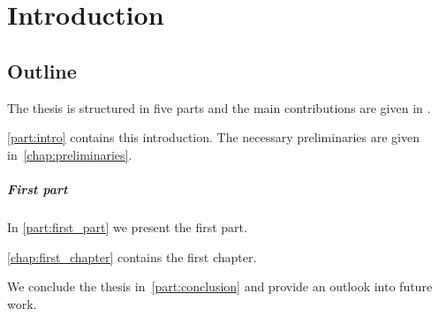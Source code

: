 \chapter{Introduction}
\label{chap:introduction}


\section{Outline}
\label{sec:intro:outline}



The thesis is structured in five parts and the main contributions are given in .


\cref{part:intro} contains this introduction.
The necessary preliminaries are given in~\cref{chap:preliminaries}.


\paragraph{First part}
In \cref{part:first_part} we present the first part.

\cref{chap:first_chapter} contains the first chapter.


We conclude the thesis in~\cref{part:conclusion} and provide an outlook into future work.
